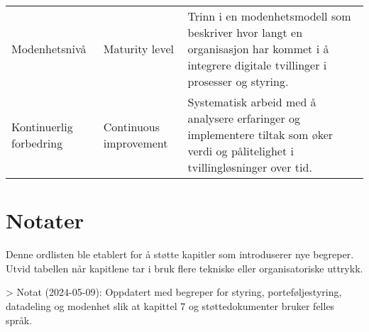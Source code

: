 \begin{longtable}{p{}p{}p{}}
Modenhetsnivå & Maturity level & Trinn i en modenhetsmodell som beskriver hvor langt en organisasjon har kommet i å integrere digitale tvillinger i prosesser og styring. \\
Kontinuerlig forbedring & Continuous improvement & Systematisk arbeid med å analysere erfaringer og implementere tiltak som øker verdi og pålitelighet i tvillingløsninger over tid. \\
\bottomrule
\end{longtable}

\section{Notater}
Denne ordlisten ble etablert for å støtte kapitler som introduserer nye begreper. Utvid tabellen når kapitlene tar i bruk flere tekniske eller organisatoriske uttrykk.

> Notat (2024-05-09): Oppdatert med begreper for styring, porteføljestyring, datadeling og modenhet slik at kapittel 7 og støttedokumenter bruker felles språk.
